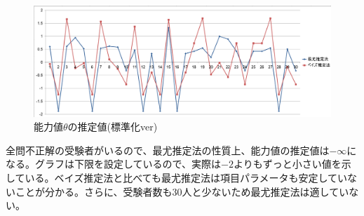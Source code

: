 \documentclass[12pt]{jarticle}
\numberwithin{equation}{subsection}
\begin{document}
\vspace{3cm}
\begin{figure}[H]
  \centering
  \includegraphics[bb = 1300 100 1 1,scale = 0.3]{saiyubay.png}
  \vspace{1cm}
  \caption{能力値$\theta$の推定値(標準化ver)}
\end{figure}
全問不正解の受験者がいるので、最尤推定法の性質上、能力値の推定値は$-\infty$になる。グラフは下限を設定しているので、実際は$-2$よりもずっと小さい値を示している。ベイズ推定法と比べても最尤推定法は項目パラメータも安定していないことが分かる。さらに、受験者数も$30$人と少ないため最尤推定法は適していない。
\end{document}
